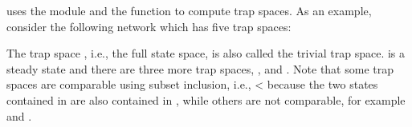\documentclass[letterpaper,10pt,english]{sphinxmanual}
\begin{document}
 uses the module {\hyperref[\detokenize{AspSolver:aspsolver}]{}} and the function {\hyperref[\detokenize{AspSolver:trap-spaces}]{}} to compute trap spaces.
As an example, consider the following network which has five trap spaces:

\begin{sphinxVerbatim}[commandchars=\\\{\}]
  \PYG{p}{[}
        
        \PYG{p}{]}
  
  
   
      
\end{sphinxVerbatim}

The trap space \sphinxcode{-{-}-}, i.e., the full state space, is also called the trivial trap space.
 is a steady state and there are three more trap spaces, ,  and .
Note that some trap spaces are comparable using subset inclusion, i.e.,
 \textless{}  because the two states contained in  are also contained in ,
while others are not comparable, for example  and .
\end{document}
